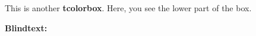 \documentclass[a4paper]{chirri} %
\begin{document}
\layout                    %

\begin{headingbox}[skin=standard,sidebyside=false]
This is another \textbf{tcolorbox}.
\tcblower
Here, you see the lower part of the box.
\end{headingbox}

\lipsum[1-3]
\textbf{Blindtext:}
\Blindtext
\end{document}
